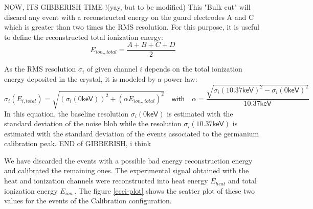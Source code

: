 {\color{red}NOW, ITS GIBBERISH TIME !(yay, but to be modified)}
This "Bulk cut" will discard any event with a reconstructed energy on the guard electrodes A and C which is greater than two times the RMS resolution.
For this purpose, it is useful to define the reconstructed total ionization energy:
\begin{equation}
E_{ion., total} = \frac{A+B+C+D}{2}
\end{equation}


As the RMS resolution $\sigma_i$ of given channel $i$ depends on the total ionization energy deposited in the crystal, it is modeled by a power law:
\begin{equation}
\sigma_i\left( E_{i, total} \right)
=
\sqrt{ 
\left( \sigma_i(0\textsf{keV}) \right)^2 + 
\left( \alpha E_{ion., total} \right)^2
}
\quad \textsf{with} \quad
\alpha = \frac{\sqrt{\sigma_i(10.37\textsf{keV})^2 - \sigma_i(0\textsf{keV})^2}}{10.37 \textsf{keV}}
\end{equation}
In this equation, the baseline resolution $\sigma_i(0\textsf{keV})$ is estimated with the standard deviation of the noise blob while the resolution $\sigma_i(10.37\textsf{keV})$ is estimated with the standard deviation of the events associated to the germanium calibration peak.
{\color{red}END of GIBBERISH, i think}



We have discarded the events with a possible bad energy reconstruction energy and calibrated the remaining ones. The experimental signal obtained with the heat and ionization channels were reconstructed into heat energy $E_{heat}$ and total ionization energy $E_{ion.}$. The figure \ref{ecei-plot} shows the scatter plot of these two values for the events of the Calibration configuration.

